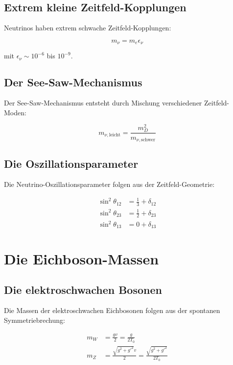 \documentclass[12pt,a4paper]{report}
\begin{document}
	\subsection{Extrem kleine Zeitfeld-Kopplungen}
	
	Neutrinos haben extrem schwache Zeitfeld-Kopplungen:
	
	\begin{equation}
		m_\nu = m_e \epsilon_\nu
	\end{equation}
	
	mit $\epsilon_\nu \sim 10^{-6}$ bis $10^{-9}$.
	
	\subsection{Der See-Saw-Mechanismus}
	
	Der See-Saw-Mechanismus entsteht durch Mischung verschiedener Zeitfeld-Moden:
	
	\begin{equation}
		m_{\nu,\text{leicht}} = \frac{m_D^2}{m_{\nu,\text{schwer}}}
	\end{equation}
	
	\subsection{Die Oszillationsparameter}
	
	Die Neutrino-Oszillationsparameter folgen aus der Zeitfeld-Geometrie:
	
	\begin{align}
		\sin^2\theta_{12} &= \frac{1}{3} + \delta_{12} \\
		\sin^2\theta_{23} &= \frac{1}{2} + \delta_{23} \\
		\sin^2\theta_{13} &= 0 + \delta_{13}
	\end{align}
	
	\section{Die Eichboson-Massen}
	
	\subsection{Die elektroschwachen Bosonen}
	
	Die Massen der elektroschwachen Eichbosonen folgen aus der spontanen Symmetriebrechung:
	
	\begin{align}
		m_W &= \frac{g v}{2} = \frac{g}{2T_0} \\
		m_Z &= \frac{\sqrt{g^2 + g'^2} v}{2} = \frac{\sqrt{g^2 + g'^2}}{2T_0}
	\end{align}
	
\end{document}
